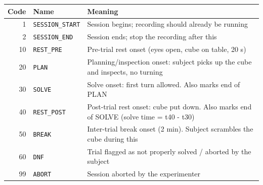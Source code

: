 \begin{tabular}{r l p{8.5cm}}
\toprule
Code & Name & Meaning \\
\midrule
  1 & \texttt{SESSION\_START} & Session begins; recording should already be running \\
  2 & \texttt{SESSION\_END} & Session ends; stop the recording after this \\
  10 & \texttt{REST\_PRE} & Pre-trial rest onset (eyes open, cube on table, 20 s) \\
  20 & \texttt{PLAN} & Planning/inspection onset: subject picks up the cube and inspects, no turning \\
  30 & \texttt{SOLVE} & Solve onset: first turn allowed. Also marks end of PLAN \\
  40 & \texttt{REST\_POST} & Post-trial rest onset: cube put down. Also marks end of SOLVE (solve time = t40 - t30) \\
  50 & \texttt{BREAK} & Inter-trial break onset (2 min). Subject scrambles the cube during this \\
  60 & \texttt{DNF} & Trial flagged as not properly solved / aborted by the subject \\
  99 & \texttt{ABORT} & Session aborted by the experimenter \\
\bottomrule
\end{tabular}
